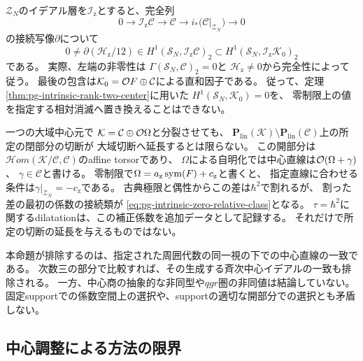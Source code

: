 \begin{remark}[相対コホモロジーと中心直線の選択]
\label{rem:pg-intrinsic-zero-relative-obstruction}
$\mathcal Z_N$のイデアル層を$\mathcal I_{\mathrm z}$とすると、完全列
\begin{equation}
 0\longrightarrow\mathcal I_{\mathrm z}\mathcal C
 \longrightarrow\mathcal C
 \longrightarrow i_*\bigl(\mathcal C|_{\mathcal Z_N}\bigr)
 \longrightarrow0
 \label{eq:pg-intrinsic-zero-relative-sequence}
\end{equation}
の接続写像$\partial$について
\begin{equation}
 0\ne
 \partial(\mathscr H_{\mathrm z}/12)
 \in H^1(\mathcal S_N,\mathcal I_{\mathrm z}\mathcal C)_2
 \subset H^1(\mathcal S_N,\mathcal I_{\mathrm z}\mathcal K_0)_2
 \label{eq:pg-intrinsic-zero-relative-class}
\end{equation}
である。
実際、左端の非零性は
$\Gamma(\mathcal S_N,\mathcal C)_2=0$と
$\mathscr H_{\mathrm z}\ne0$から完全性によって従う。
最後の包含は$\mathcal K_0=\mathcal O F\oplus\mathcal C$による直和因子である。
従って、定理\ref{thm:pg-intrinsic-rank-two-center}に用いた
$H^1(\mathcal S_N,\mathcal K_0)=0$を、
零制限上の値を指定する相対消滅へ置き換えることはできない。

一つの大域中心元で
$\mathcal K=\mathcal C\oplus\mathcal O\Omega$と分裂させても、
$\mathbf P_{\mathrm{lin}}(\mathcal K)\setminus
\mathbf P_{\mathrm{lin}}(\mathcal C)$上の所定の閉部分の切断が
大域切断へ延長するとは限らない。
この開部分は$\mathcal Hom(\mathcal K/\mathcal C,\mathcal C)$のaffine torsorであり、
$\Omega$による自明化では中心直線は$\mathcal O(\Omega+\gamma)$、
$\gamma\in\mathcal C$と書ける。
零制限で$\Omega=a_{\mathrm z}\operatorname{sym}(F)+c_{\mathrm z}$と書くと、
指定直線に合わせる条件は$\gamma|_{\mathcal Z_N}=-c_{\mathrm z}$である。
古典極限と偶性からこの差は$\hbar^2$で割れるが、
割った差の最初の係数の接続類が
\eqref{eq:pg-intrinsic-zero-relative-class}となる。
$\tau=\hbar^2$に関するdilatationは、この補正係数を追加データとして記録する。
それだけで所定の切断の延長を与えるものではない。

本命題が排除するのは、指定された周囲代数の同一視の下での中心直線の一致である。
次数三の部分で比較すれば、その生成する斉次中心イデアルの一致も排除される。
一方、中心商の抽象的な非同型や$qgr$圏の非同値は結論していない。
固定supportでの係数空間上の選択や、supportの適切な開部分での選択とも矛盾しない。
\end{remark}

\subsection{中心調整による方法の限界}

